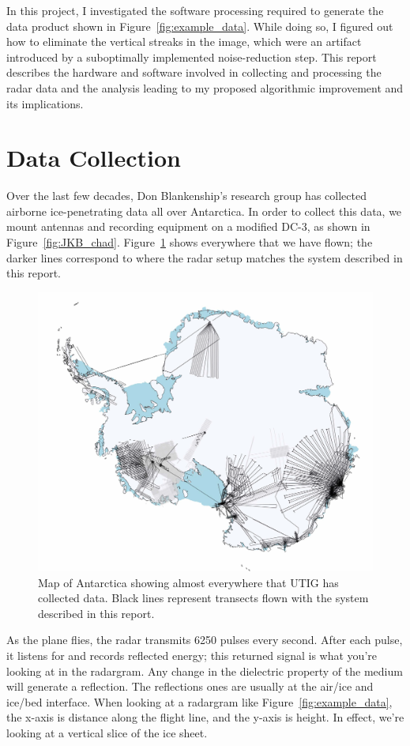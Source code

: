 \documentclass[11pt]{article}
\newcommand{\figref}[1]{Figure~\ref{#1}}
\begin{document}
In this project, I investigated the software processing required to generate the data product shown in \figref{fig:example_data}. While doing so, I figured out how to eliminate the vertical streaks in the image, which were an artifact introduced by a suboptimally implemented noise-reduction step. This report describes the hardware and software involved in collecting and processing the radar data and the analysis leading to my proposed algorithmic improvement and its implications.

\section{Data Collection}

Over the last few decades, Don Blankenship's research group has collected airborne ice-penetrating data all over Antarctica. In order to collect this data, we mount antennas and recording equipment on a modified DC-3, as shown in \figref{fig:JKB_chad}. \figref{fig:all_data} shows everywhere that we have flown; the darker lines correspond to where the radar setup matches the system described in this report. 

\begin{figure}[ht!]
\centering
\includegraphics[width=0.65\columnwidth]{figures/all_data_small.jpg}
\caption[]{Map of Antarctica showing almost everywhere that UTIG has collected data. Black lines represent transects flown with the system described in this report.}
\label{fig:all_data}
\end{figure}

As the plane flies, the radar transmits 6250 pulses every second.
After each pulse, it listens for and records reflected energy; this returned signal is what you're looking at in the radargram.
Any change in the dielectric property of the medium will generate a reflection. The reflections ones are usually at the air/ice and ice/bed interface. 
When looking at a radargram like \figref{fig:example_data}, the x-axis is distance along the flight line, and the y-axis is height. In effect, we're looking at a vertical slice of the ice sheet.
\end{document}

